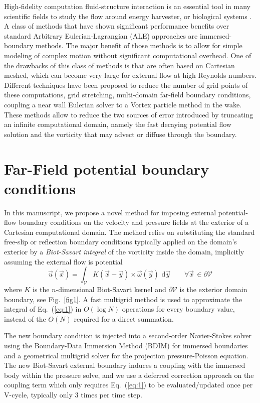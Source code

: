 \documentclass{article}
\begin{document}
High-fidelity computation fluid-structure interaction is an essential tool in many scientific fields to study the flow around energy harvester, or biological systems \cite{Lauber2023RapidFlight}. A class of methods that have shown significant performance benefits over standard Arbitrary Eulerian-Lagrangian (ALE) approaches are immersed-boundary methods. The major benefit of those methods is to allow for simple modeling of complex motion without significant computational overhead. One of the drawbacks of this class of methods is that are often based on Cartesian meshed, which can become very large for external flow at high Reynolds numbers. Different techniques have been proposed to reduce the number of grid points of these computations, grid stretching, multi-domain far-field boundary conditions\cite{Colonius2008}, coupling a near wall Eulerian solver to a Vortex particle method in the wake\cite{Billuart2023AFlows}. These methods allow to reduce the two sources of error introduced by truncating an infinite computational domain, namely the fast decaying potential flow solution and the vorticity that may advect or diffuse through the boundary\cite{Colonius2008}.

\section{Far-Field potential boundary conditions}

In this manuscript, we propose a novel method for imposing external potential-flow boundary conditions on the velocity and pressure fields at the exterior of a Cartesian computational domain. The method relies on substituting the standard free-slip or reflection boundary conditions typically applied on the domain's exterior by a \emph{Biot-Savart integral} of the vorticity inside the domain, implicitly assuming the external flow is potential
\begin{equation}\label{eq:1}
    {\vec u}({\vec x}) = \int_{\mathcal{V}}K({\vec x} - \vec{y})\times \vec\omega({\vec y})\text{ d}\vec{y} \quad\quad \forall \vec x\, \in \partial\mathcal{V}
\end{equation}
where $K$ is the $n$-dimensional Biot-Savart kernel and $\partial\mathcal{V}$ is the exterior domain boundary, see Fig.~\ref{fig1}. A fast multigrid method is used to approximate the integral of Eq.~(\ref{eq:1}) in $O(\log N)$ operations for every boundary value, instead of the $O(N)$ required for a direct summation.

The new boundary condition is injected into a second-order Navier-Stokes solver using the Boundary-Data Immersion Method (BDIM) \cite{Maertens2015, Lauber2022} for immersed boundaries and a geometrical multigrid solver for the projection pressure-Poisson equation. The new Biot-Savart external boundary induces a coupling with the immersed body within the pressure solve, and we use a deferred correction approach on the coupling term which only requires Eq.~(\ref{eq:1}) to be evaluated/updated once per V-cycle, typically only 3 times per time step.
\end{document}
